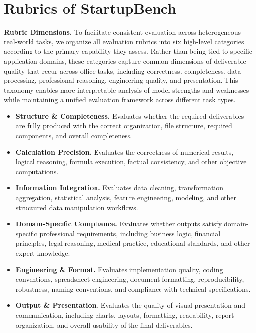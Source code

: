 \section{Rubrics of StartupBench}
\label{app:rubrics}


\textbf{Rubric Dimensions.} To facilitate consistent evaluation across heterogeneous real-world tasks, we organize all evaluation rubrics into six high-level categories according to the primary capability they assess. Rather than being tied to specific application domains, these categories capture common dimensions of deliverable quality that recur across office tasks, including correctness, completeness, data processing, professional reasoning, engineering quality, and presentation. This taxonomy enables more interpretable analysis of model strengths and weaknesses while maintaining a unified evaluation framework across different task types.

\begin{itemize}
    \item \textbf{Structure \& Completeness.}
    Evaluates whether the required deliverables are fully produced with the correct organization, file structure, required components, and overall completeness.

    \item \textbf{Calculation Precision.}
    Evaluates the correctness of numerical results, logical reasoning, formula execution, factual consistency, and other objective computations.

    \item \textbf{Information Integration.}
    Evaluates data cleaning, transformation, aggregation, statistical analysis, feature engineering, modeling, and other structured data manipulation workflows.

    \item \textbf{Domain-Specific Compliance.}
    Evaluates whether outputs satisfy domain-specific professional requirements, including business logic, financial principles, legal reasoning, medical practice, educational standards, and other expert knowledge.

    \item \textbf{Engineering \& Format.}
    Evaluates implementation quality, coding conventions, spreadsheet engineering, document formatting, reproducibility, robustness, naming conventions, and compliance with technical specifications.

    \item \textbf{Output \& Presentation.}
    Evaluates the quality of visual presentation and communication, including charts, layouts, formatting, readability, report organization, and overall usability of the final deliverables.
\end{itemize}

